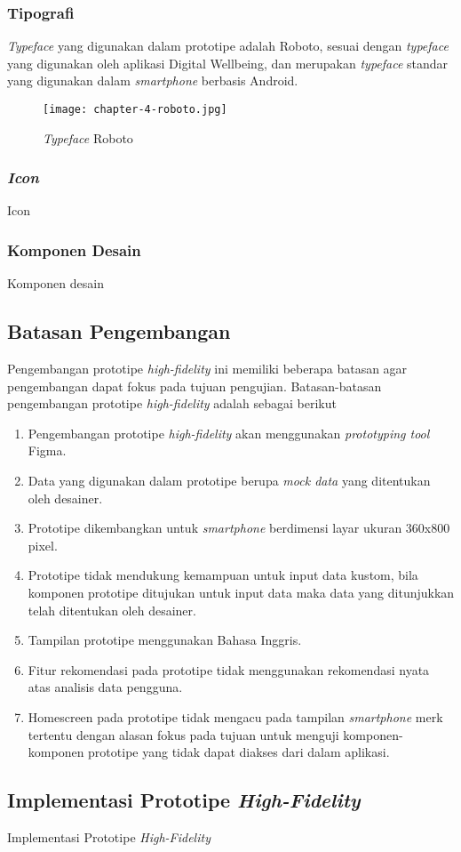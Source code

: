 \subsubsection{Tipografi}
\label{subsubsec:aspek_tipografi}
\textit{Typeface} yang digunakan dalam prototipe adalah Roboto, sesuai dengan \textit{typeface} yang digunakan oleh aplikasi Digital Wellbeing, dan merupakan \textit{typeface} standar yang digunakan dalam \textit{smartphone} berbasis Android.

\begin{figure}[h]
  \centering
  \texttt{[image: chapter-4-roboto.jpg]}
  \caption{\textit{Typeface} Roboto}
  \label{img:typeface}
\end{figure}

\subsubsection{\textit{Icon}}
\label{subsubsec:aspek_icon}
Icon
 
\subsubsection{Komponen Desain}
\label{subsubsec:komponen_hifi_1}

Komponen desain


\subsection{Batasan Pengembangan}
\label{subsec:batasan_hifi_1}

Pengembangan prototipe \textit{high-fidelity} ini memiliki beberapa batasan agar pengembangan dapat fokus pada tujuan pengujian. Batasan-batasan pengembangan prototipe \textit{high-fidelity} adalah sebagai berikut

\begin{enumerate}
  \item Pengembangan prototipe \textit{high-fidelity} akan menggunakan \textit{prototyping tool} Figma.
  \item Data yang digunakan dalam prototipe berupa \textit{mock data} yang ditentukan oleh desainer.
  \item Prototipe dikembangkan untuk \textit{smartphone} berdimensi layar ukuran 360x800 pixel.
  \item Prototipe tidak mendukung kemampuan untuk input data kustom, bila komponen prototipe ditujukan untuk input data maka data yang ditunjukkan telah ditentukan oleh desainer.
  \item Tampilan prototipe menggunakan Bahasa Inggris. 
  \item Fitur rekomendasi pada prototipe tidak menggunakan rekomendasi nyata atas analisis data pengguna.
  \item Homescreen pada prototipe tidak mengacu pada tampilan \textit{smartphone} merk tertentu dengan alasan fokus pada tujuan untuk menguji komponen-komponen prototipe yang tidak dapat diakses dari dalam aplikasi.
\end{enumerate}

\subsection{Implementasi Prototipe \textit{High-Fidelity}}

Implementasi Prototipe \textit{High-Fidelity}

